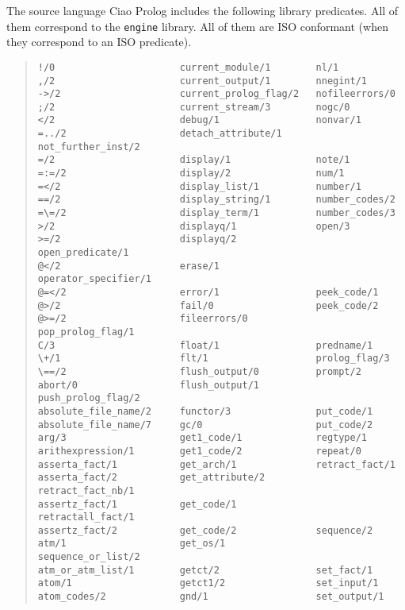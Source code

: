 The source language Ciao Prolog includes the following library
predicates. All of them correspond to the \verb+engine+ library. All
of them are ISO conformant (when they correspond to an ISO predicate).
\begin{quote}
\begin{verbatim}
!/0                      current_module/1        nl/1                 
,/2                      current_output/1        nnegint/1            
->/2                     current_prolog_flag/2   nofileerrors/0       
;/2                      current_stream/3        nogc/0               
</2                      debug/1                 nonvar/1             
=../2                    detach_attribute/1      not_further_inst/2   
=/2                      display/1               note/1               
=:=/2                    display/2               num/1                
=</2                     display_list/1          number/1             
==/2                     display_string/1        number_codes/2       
=\=/2                    display_term/1          number_codes/3       
>/2                      displayq/1              open/3               
>=/2                     displayq/2              open_predicate/1     
@</2                     erase/1                 operator_specifier/1 
@=</2                    error/1                 peek_code/1          
@>/2                     fail/0                  peek_code/2          
@>=/2                    fileerrors/0            pop_prolog_flag/1    
C/3                      float/1                 predname/1           
\+/1                     flt/1                   prolog_flag/3        
\==/2                    flush_output/0          prompt/2             
abort/0                  flush_output/1          push_prolog_flag/2   
absolute_file_name/2     functor/3               put_code/1           
absolute_file_name/7     gc/0                    put_code/2           
arg/3                    get1_code/1             regtype/1            
arithexpression/1        get1_code/2             repeat/0             
asserta_fact/1           get_arch/1              retract_fact/1       
asserta_fact/2           get_attribute/2         retract_fact_nb/1    
assertz_fact/1           get_code/1              retractall_fact/1    
assertz_fact/2           get_code/2              sequence/2           
atm/1                    get_os/1                sequence_or_list/2   
atm_or_atm_list/1        getct/2                 set_fact/1           
atom/1                   getct1/2                set_input/1          
atom_codes/2             gnd/1                   set_output/1         

\end{verbatim}
\end{quote}
